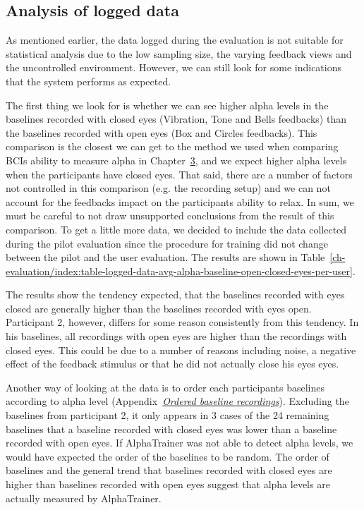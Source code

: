 \documentclass[a4paper,10pt,english,lof,lot,twoside]{puthesis}
\begin{document}
\subsection{Analysis of logged data}
\label{ch-evaluation/index:analysis-of-logged-data}
As mentioned earlier, the data logged during the evaluation is not suitable for statistical analysis due to the low sampling size, the varying feedback views and the uncontrolled environment. However, we can still look for some indications that the system performs as expected.

The first thing we look for is whether we can see higher alpha levels in the baselines recorded with closed eyes (Vibration, Tone and Bells feedbacks) than the baselines recorded with open eyes (Box and Circles feedbacks). This comparison is the closest we can get to the method we used when comparing BCIs ability to measure alpha in Chapter {\hyperref[ch-experiment/index:ch-experiment]{3}}, and we expect higher alpha levels when the participants have closed eyes. That said, there are a number of factors not controlled in this comparison (e.g. the recording setup) and we can not account for the feedbacks impact on the participants ability to relax. In sum, we must be careful to not draw unsupported conclusions from the result of this comparison. To get a little more data, we decided to include the data collected during the pilot evaluation since the procedure for training did not change between the pilot and the user evaluation. The results are shown in Table \ref{ch-evaluation/index:table-logged-data-avg-alpha-baseline-open-closed-eyes-per-user}.

The results show the tendency expected, that the baselines recorded with eyes closed are generally higher than the baselines recorded with eyes open. Participant 2, however, differs for some reason consistently from this tendency. In his baselines, all recordings with open eyes are higher than the recordings with closed eyes. This could be due to a number of reasons including noise, a negative effect of the feedback stimulus or that he did not actually close his eyes eyes.

Another way of looking at the data is to order each participants baselines according to alpha level (Appendix {\hyperref[appendix_evaluation:appendix-final-evaluation-ordered-baseline-recordings]{\emph{Ordered baseline recordings}}}). Excluding the baselines from participant 2, it only appears in 3 cases of the 24 remaining baselines that a baseline recorded with closed eyes was lower than a baseline recorded with open eyes. If AlphaTrainer was not able to detect alpha levels, we would have expected the order of the baselines to be random. The order of baselines and the general trend that baselines recorded with closed eyes are higher than baselines recorded with open eyes suggest that alpha levels are actually measured by AlphaTrainer.
\end{document}
